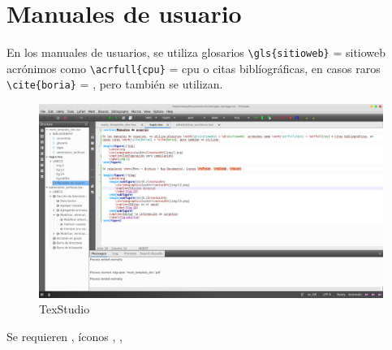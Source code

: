 \section{Manuales de usuario}

En los manuales de usuarios, se utiliza glosarios \verb|\gls{sitioweb}| = \gls{sitioweb}  acrónimos como \verb|\acrfull{cpu}| = \acrfull{cpu} o citas biblíográficas, en casos raros \verb|\cite{boria}| = \cite{boria}, pero también se utilizan.

\begin{figure}[!htb]
	\centering
	\includegraphics[width=1\textwidth]{img/3.png}
	\caption{TexStudio}
	\label{img:1}
\end{figure}

Se requieren , íconos \faTrash, \faGlobe, \faLock

